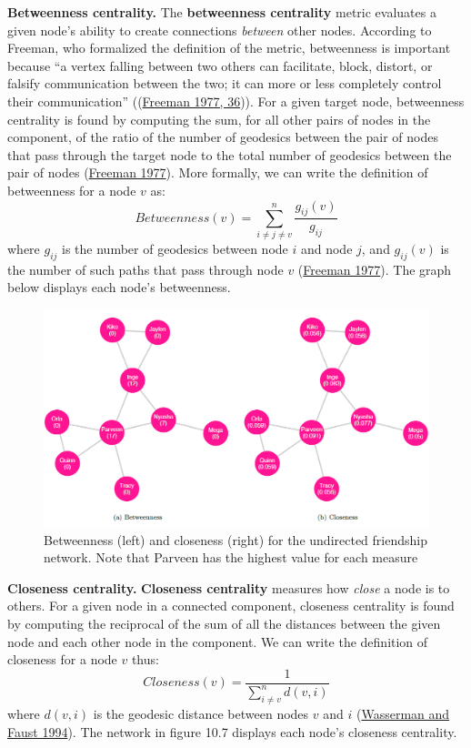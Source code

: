 \documentclass{book}
\begin{document}
\textbf{Betweenness centrality.} The \textbf{betweenness centrality} metric
evaluates a given node's ability to create connections \emph{between} other
nodes. According to Freeman, who formalized the definition of the metric,
betweenness is important because ``a vertex falling between two others can
facilitate, block, distort, or falsify communication between the two; it can
more or less completely control their communication''
((\protect\hyperlink{ref-Freeman1977}{Freeman 1977, 36})). For a given target
node, betweenness centrality is found by computing the sum, for all other
pairs of nodes in the component, of the ratio of the number of geodesics
between the pair of nodes that pass through the target node to the total
number of geodesics between the pair of nodes
(\protect\hyperlink{ref-Freeman1977}{Freeman 1977}). More formally, we can
write the definition of betweenness for a node \(v\) as:
\[Betweenness(v) = \sum_{i \neq j \neq v}^{n}\frac{g_{ij}(v)}{g_{ij}}\] where
\(g_{ij}\) is the number of geodesics between node \(i\) and node \(j\), and
\(g_{ij}(v)\) is the number of such paths that pass through node \(v\)
(\protect\hyperlink{ref-Freeman1977}{Freeman 1977}). The graph below displays
each node's betweenness.

\begin{figure}
\centering
\includegraphics{images/social-networks/11-7.png}
\caption{Betweenness (left) and closeness (right) for the undirected
friendship network. Note that Parveen has the highest value for each measure}
\end{figure}

\textbf{Closeness centrality.} \textbf{Closeness centrality} measures how
\emph{close} a node is to others. For a given node in a connected component,
closeness centrality is found by computing the reciprocal of the sum of all
the distances between the given node and each other node in the component. We
can write the definition of closeness for a node \(v\) thus:
\[Closeness(v) = \frac{1}{\sum_{i \neq v}^{n}d(v, i)}\] where \(d(v, i)\) is
the geodesic distance between nodes \(v\) and \(i\)
(\protect\hyperlink{ref-WassermanFaust1994}{Wasserman and Faust 1994}). The
network in figure 10.7 displays each node's closeness centrality.
\end{document}
